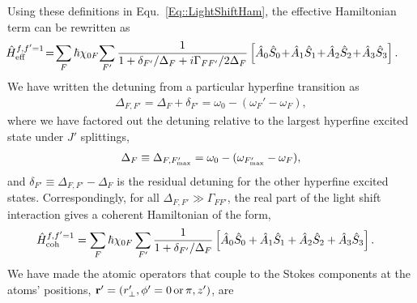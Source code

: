 \documentclass[preprint,aps,pra,onecolumn]{revtex4-1} %
\begin{document}
Using these definitions in Equ.~\eqref{Eq::LightShiftHam}, the effective Hamiltonian term can be rewritten as
\begin{align}
\!\!\!\! \hat{H}_{\rm eff}^{f,f'=1} &\!=\! \sum_{F} \hbar \chi_{0F}\! \sum_{F'}\frac{1}{1+\delta_{F'}/\Delta_F+i\Gamma_{FF'}/2\Delta_F}\left[\hat{A}_0\hat{S}_0 \!+\! \hat{A}_1\hat{S}_1 \!+\! \hat{A}_2\hat{S}_2 \!+\!\hat{A}_3\hat{S}_3 \right]. 
\end{align}
We have written the detuning from a particular hyperfine transition as
\begin{align}
	\Delta_{F,F'} = \Delta_F + \delta_{F'}=\omega_0-(\omega_F'-\omega_F),
\end{align}
where we have factored out the detuning relative to the largest hyperfine excited state under $ J' $ splittings,
\begin{align} \label{Eq::DetuningChoice}
	\Delta_F \equiv \Delta_{F,F'_{\rm max}} = \omega_0 - ( \omega_{F'_{\rm max}} - \omega_F),
\end{align} 
and $\delta_{F'} \equiv \Delta_{F,F'} - \Delta_F$ is the residual detuning for the other hyperfine excited states. Correspondingly, for all $\Delta_{F,F'}\gg \Gamma_{FF'}$, the real part of the light shift interaction gives a coherent Hamiltonian of the form,
\begin{align} \label{Eq::StokesHam}
	\hat{H}_{\rm coh}^{f,f'=1} &= \sum_F \hbar \chi_{0F} \sum_{F'} \frac{1}{1+ \delta_{F'}/\Delta_F} \left[\hat{A}_0\hat{S}_0 +\hat{A}_1\hat{S}_1 +\hat{A}_2\hat{S}_2 +\hat{A}_3\hat{S}_3 \right]. 
\end{align}
We have made the atomic operators that couple to the Stokes components at the atoms' positions, $\mathbf{r}'=(r_\perp^\prime,\phi'=0\,\mathrm{or}\, \pi, z')$, are
\end{document}
